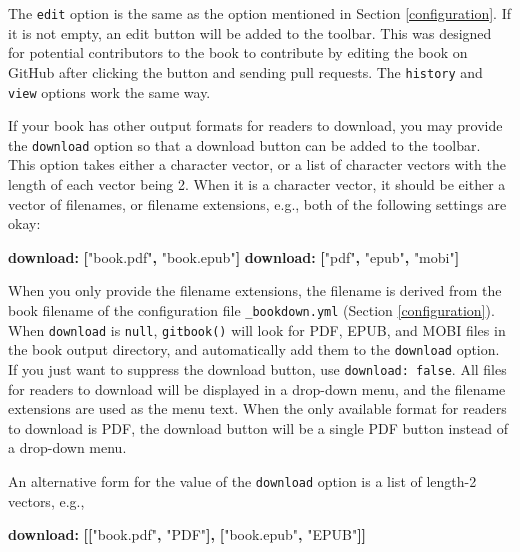 \documentclass[
  12pt,
]{krantz}
\newenvironment{Shaded}{\begin{snugshade}}{\end{snugshade}}
\newcommand{\AttributeTok}[1]{\textcolor[rgb]{0.13,0.29,0.53}{#1}}
\newcommand{\FunctionTok}[1]{\textcolor[rgb]{0.13,0.29,0.53}{\textbf{#1}}}
\newcommand{\KeywordTok}[1]{\textcolor[rgb]{0.13,0.29,0.53}{\textbf{#1}}}
\newcommand{\StringTok}[1]{\textcolor[rgb]{0.31,0.60,0.02}{#1}}
\theoremstyle{definition}
\theoremstyle{definition}
\theoremstyle{definition}
\theoremstyle{definition}
\theoremstyle{remark}
\begin{document}
The \texttt{edit} option is the same as the option mentioned in Section \ref{configuration}. If it is not empty, an edit button will be added to the toolbar. This was designed for potential contributors to the book to contribute by editing the book on GitHub after clicking the button and sending pull requests. The \texttt{history} and \texttt{view} options work the same
way.

If your book has other output formats for readers to download, you may provide the \texttt{download} option so that a download button can be added to the toolbar. This option takes either a character vector, or a list of character vectors with the length of each vector being 2. When it is a character vector, it should be either a vector of filenames, or filename extensions, e.g., both of the following settings are okay:

\begin{Shaded}
\begin{Highlighting}[]
\AttributeTok{    }\FunctionTok{download}\KeywordTok{:}\AttributeTok{ }\KeywordTok{[}\StringTok{"book.pdf"}\KeywordTok{,}\AttributeTok{ }\StringTok{"book.epub"}\KeywordTok{]}
\AttributeTok{    }\FunctionTok{download}\KeywordTok{:}\AttributeTok{ }\KeywordTok{[}\StringTok{"pdf"}\KeywordTok{,}\AttributeTok{ }\StringTok{"epub"}\KeywordTok{,}\AttributeTok{ }\StringTok{"mobi"}\KeywordTok{]}
\end{Highlighting}
\end{Shaded}

When you only provide the filename extensions, the filename is derived from the book filename of the configuration file \texttt{\_bookdown.yml} (Section \ref{configuration}). When \texttt{download} is \texttt{null}, \texttt{gitbook()} will look for PDF, EPUB, and MOBI files in the book output directory, and automatically add them to the \texttt{download} option. If you just want to suppress the download button, use \texttt{download:\ false}. All files for readers to download will be displayed in a drop-down menu, and the filename extensions are used as the menu text. When the only available format for readers to download is PDF, the download button will be a single PDF button instead of a drop-down menu.

An alternative form for the value of the \texttt{download} option is a list of length-2 vectors, e.g.,

\begin{Shaded}
\begin{Highlighting}[]
\AttributeTok{    }\FunctionTok{download}\KeywordTok{:}\AttributeTok{ }\KeywordTok{[[}\StringTok{"book.pdf"}\KeywordTok{,}\AttributeTok{ }\StringTok{"PDF"}\KeywordTok{],}\AttributeTok{ }\KeywordTok{[}\StringTok{"book.epub"}\KeywordTok{,}\AttributeTok{ }\StringTok{"EPUB"}\KeywordTok{]]}
\end{Highlighting}
\end{Shaded}
\end{document}

